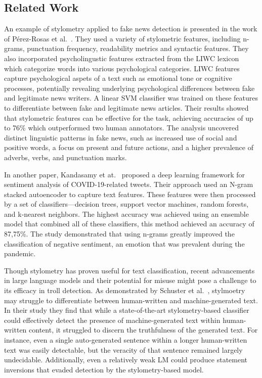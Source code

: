 \documentclass[twoside]{ctuthesis}
\theoremstyle{plain}
\theoremstyle{definition}
\theoremstyle{note}
\begin{document}
\subsection{Related Work}
An example of stylometry applied to fake news detection is presented in the work of Pérez-Rosas et al.~\cite{PerezRosas2018Stylometry}. They used a variety of stylometric features, including n-grams, punctuation frequency, readability metrics and syntactic features. They also incorporated psycholingustic features extracted from the LIWC lexicon which categorize words into various psychological categories. LIWC features capture psychological aspets of a text such as emotional tone or cognitive processes, potentially revealing underlying psychological differences between fake and legitimate news writers. A linear SVM classifier was trained on these features to differentiate between fake and legitimate news articles. Their results showed that stylometric features can be effective for the task, achieving accuracies of up to 76\% which outperformed two human annotators. The analysis uncovered distinct linguistic patterns in fake news, such as increased use of social and positive words, a focus on present and future actions, and a higher prevalence of adverbs, verbs, and punctuation marks. 

In another paper, Kandasamy et at.~\cite{Kandasamy2021COVID} proposed a deep learning framework for sentiment analysis of COVID-19-related tweets. Their approach used an N-gram stacked autoencoder to capture text features. These features were then processed by a set of classifiers—decision trees, support vector machines, random forests, and k‑nearest neighbors. The highest accuracy was achieved using an ensemble model that combined all of these classifiers, this method achieved an accuracy of 87,75\%. The study demonstrated that using n‑grams greatly improved the classification of negative sentiment, an emotion that was prevalent during the pandemic.

Though stylometry has proven useful for text classification, recent advancements in large language models and their potential for misuse might pose a challenge to its efficacy in troll detection. As demonstrated by Schuster et al.~\cite{Schuster2020}, stylmoetry may struggle to differentiate between human-written and machine-generated text. In their study they find that while a state-of-the-art stylometry-based classifier could effectively detect the presence of machine-generated text within human-written content, it struggled to discern the truthfulness of the generated text.  For instance, even a single auto-generated sentence within a longer human-written text was easily detectable, but the veracity of that sentence remained largely undecidable.  Additionally, even a relatively weak LM could produce statement inversions that evaded detection by the stylometry-based model.
\end{document}
